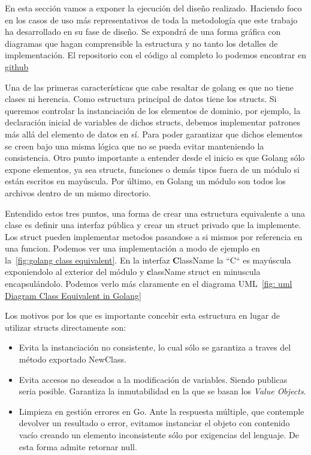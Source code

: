 
En esta sección vamos a exponer la ejecución del diseño realizado. Haciendo foco en los casos de uso más representativos de toda la metodología que este trabajo ha desarrollado en su fase de diseño. Se expondrá de una forma gráfica con diagramas que hagan comprensible la estructura y no tanto los detalles de implementación. El repositorio con el código al completo lo podemos encontrar en \href{https://github.com/Enrikerf/pfm}{github}

Una de las primeras características que cabe resaltar de golang es que no tiene clases ni herencia. Como estructura principal de datos tiene los structs. Si queremos controlar la instanciación de los elementos de dominio, por ejemplo, la declaración inicial de variables de dichos structs, debemos implementar patrones más allá del elemento de datos en sí. Para poder garantizar que dichos elementos se creen bajo una misma lógica que no se pueda evitar manteniendo la consistencia. Otro punto importante a entender desde el inicio es que Golang sólo expone elementos, ya sea structs, funciones o demás tipos fuera de un módulo si están escritos en mayúscula. Por último, en Golang un módulo son todos los archivos dentro de un mismo directorio.

Entendido estos tres puntos, una forma de crear una estructura equivalente a una clase es definir una interfaz pública y crear un struct privado que la implemente. Los struct pueden implementar metodos pasandose a si mismos por referencia en una funcion. Podemos ver una implementación a modo de ejemplo en la~\cref{fig:golang class equivalent}. En la interfaz \textbf{C}lassName la “C“ es mayúscula exponiendolo al exterior del módulo y \textbf{c}lassName struct en minuscula encapsulándolo. Podemos verlo más claramente en el diagrama UML~\cref{fig: uml Diagram Class Equivalent in Golang}

Los motivos por los que es importante concebir esta estructura en lugar de utilizar structs directamente son:

\begin{itemize}
    \item Evita la instanciación no consistente, lo cual sólo se garantiza a traves del método exportado NewClass.
    \item Evita accesos no deseados a la modificación de variables. Siendo publicas seria posible. Garantiza la inmutabilidad en la que se basan los \textit{Value Objects}.
    \item Limpieza en gestión errores en Go. Ante la respuesta múltiple, que contemple devolver un resultado o error, evitamos instanciar el objeto con contenido vacío creando un elemento inconsistente sólo por exigencias del lenguaje. De esta forma admite retornar null.
\end{itemize}

